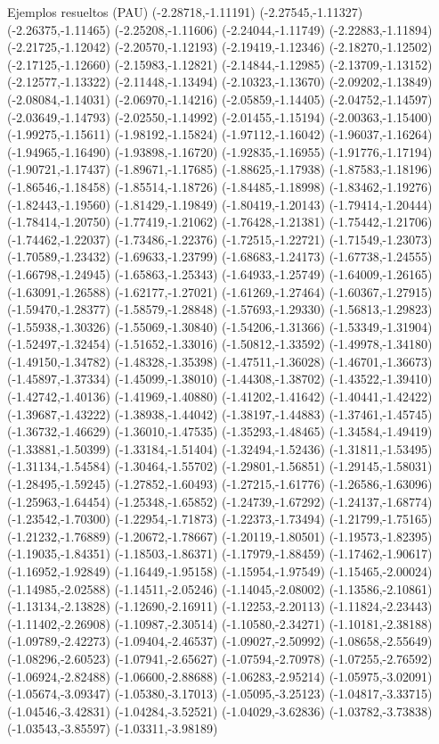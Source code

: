 \documentclass[11pt,a4paper]{article}
\begin{document}
\begin{fmex}{Ejemplos resueltos (PAU)}
(-2.28718,-1.11191) (-2.27545,-1.11327) (-2.26375,-1.11465) (-2.25208,-1.11606) (-2.24044,-1.11749) (-2.22883,-1.11894) (-2.21725,-1.12042) (-2.20570,-1.12193) (-2.19419,-1.12346) (-2.18270,-1.12502) (-2.17125,-1.12660) (-2.15983,-1.12821) (-2.14844,-1.12985) (-2.13709,-1.13152) (-2.12577,-1.13322) (-2.11448,-1.13494) (-2.10323,-1.13670) (-2.09202,-1.13849) (-2.08084,-1.14031) (-2.06970,-1.14216) (-2.05859,-1.14405) (-2.04752,-1.14597) (-2.03649,-1.14793) (-2.02550,-1.14992) (-2.01455,-1.15194) (-2.00363,-1.15400) (-1.99275,-1.15611) (-1.98192,-1.15824) (-1.97112,-1.16042) (-1.96037,-1.16264) (-1.94965,-1.16490) (-1.93898,-1.16720) (-1.92835,-1.16955) (-1.91776,-1.17194) (-1.90721,-1.17437) (-1.89671,-1.17685) (-1.88625,-1.17938) (-1.87583,-1.18196) (-1.86546,-1.18458) (-1.85514,-1.18726) (-1.84485,-1.18998) (-1.83462,-1.19276) (-1.82443,-1.19560) (-1.81429,-1.19849) (-1.80419,-1.20143) (-1.79414,-1.20444) (-1.78414,-1.20750) (-1.77419,-1.21062) (-1.76428,-1.21381) (-1.75442,-1.21706) (-1.74462,-1.22037) (-1.73486,-1.22376) (-1.72515,-1.22721) (-1.71549,-1.23073) (-1.70589,-1.23432) (-1.69633,-1.23799) (-1.68683,-1.24173) (-1.67738,-1.24555) (-1.66798,-1.24945) (-1.65863,-1.25343) (-1.64933,-1.25749) (-1.64009,-1.26165) (-1.63091,-1.26588) (-1.62177,-1.27021) (-1.61269,-1.27464) (-1.60367,-1.27915) (-1.59470,-1.28377) (-1.58579,-1.28848) (-1.57693,-1.29330) (-1.56813,-1.29823) (-1.55938,-1.30326) (-1.55069,-1.30840) (-1.54206,-1.31366) (-1.53349,-1.31904) (-1.52497,-1.32454) (-1.51652,-1.33016) (-1.50812,-1.33592) (-1.49978,-1.34180) (-1.49150,-1.34782) (-1.48328,-1.35398) (-1.47511,-1.36028) (-1.46701,-1.36673) (-1.45897,-1.37334) (-1.45099,-1.38010) (-1.44308,-1.38702) (-1.43522,-1.39410) (-1.42742,-1.40136) (-1.41969,-1.40880) (-1.41202,-1.41642) (-1.40441,-1.42422) (-1.39687,-1.43222) (-1.38938,-1.44042) (-1.38197,-1.44883) (-1.37461,-1.45745) (-1.36732,-1.46629) (-1.36010,-1.47535) (-1.35293,-1.48465) (-1.34584,-1.49419) (-1.33881,-1.50399) (-1.33184,-1.51404) (-1.32494,-1.52436) (-1.31811,-1.53495) (-1.31134,-1.54584) (-1.30464,-1.55702) (-1.29801,-1.56851) (-1.29145,-1.58031) (-1.28495,-1.59245) (-1.27852,-1.60493) (-1.27215,-1.61776) (-1.26586,-1.63096) (-1.25963,-1.64454) (-1.25348,-1.65852) (-1.24739,-1.67292) (-1.24137,-1.68774) (-1.23542,-1.70300) (-1.22954,-1.71873) (-1.22373,-1.73494) (-1.21799,-1.75165) (-1.21232,-1.76889) (-1.20672,-1.78667) (-1.20119,-1.80501) (-1.19573,-1.82395) (-1.19035,-1.84351) (-1.18503,-1.86371) (-1.17979,-1.88459) (-1.17462,-1.90617) (-1.16952,-1.92849) (-1.16449,-1.95158) (-1.15954,-1.97549) (-1.15465,-2.00024) (-1.14985,-2.02588) (-1.14511,-2.05246) (-1.14045,-2.08002) (-1.13586,-2.10861) (-1.13134,-2.13828) (-1.12690,-2.16911) (-1.12253,-2.20113) (-1.11824,-2.23443) (-1.11402,-2.26908) (-1.10987,-2.30514) (-1.10580,-2.34271) (-1.10181,-2.38188) (-1.09789,-2.42273) (-1.09404,-2.46537) (-1.09027,-2.50992) (-1.08658,-2.55649) (-1.08296,-2.60523) (-1.07941,-2.65627) (-1.07594,-2.70978) (-1.07255,-2.76592) (-1.06924,-2.82488) (-1.06600,-2.88688) (-1.06283,-2.95214) (-1.05975,-3.02091) (-1.05674,-3.09347) (-1.05380,-3.17013) (-1.05095,-3.25123) (-1.04817,-3.33715) (-1.04546,-3.42831) (-1.04284,-3.52521) (-1.04029,-3.62836) (-1.03782,-3.73838) (-1.03543,-3.85597) (-1.03311,-3.98189) 
\end{fmex}
\end{document}
